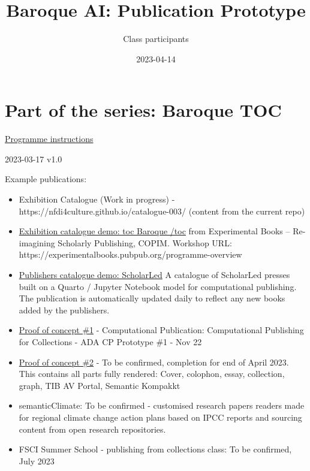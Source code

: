 \documentclass[
  letterpaper,
]{book}
\title{Baroque AI: Publication Prototype}
\author{Class participants}
\date{2023-04-14}
\renewcommand*\contentsname{Table of contents}
\newcommand\contentsname{Table of contents}
\begin{document}
\frontmatter
\maketitle
\ifdefined\Shaded\renewenvironment{Shaded}{\begin{tcolorbox}[enhanced, borderline west={3pt}{0pt}{shadecolor}, interior hidden, boxrule=0pt, breakable, sharp corners, frame hidden]}{\end{tcolorbox}}\fi

\renewcommand*\contentsname{Table of contents}
{
\setcounter{tocdepth}{2}
\tableofcontents
}
\mainmatter
{}

\hypertarget{part-of-the-series-baroque-toc}{%
\chapter{Part of the series: Baroque
TOC}\label{part-of-the-series-baroque-toc}}

\href{https://nfdi4culture.github.io/class-ADA-CP-pipeline/}{Programme
instructions}

2023-03-17 v1.0

Example publications:

\begin{itemize}
\item
  Exhibition Catalogue (Work in progress) -
  https://nfdi4culture.github.io/catalogue-003/ (content from the
  current repo)
\item
  \href{https://nfdi4culture.github.io/experimental-books-workshop/}{Exhibition
  catalogue demo: toc Baroque /toc} from Experimental Books --
  Re-imagining Scholarly Publishing, COPIM. Workshop URL:
  https://experimentalbooks.pubpub.org/programme-overview
\item
  \href{https://simonxix.github.io/scholarled_catalogue/}{Publishers
  catalogue demo: ScholarLed} A catalogue of ScholarLed presses built on
  a Quarto / Jupyter Notebook model for computational publishing. The
  publication is automatically updated daily to reflect any new books
  added by the publishers.
\item
  \href{https://nfdi4culture.github.io/cp4c/}{Proof of concept \#1} -
  Computational Publication: Computational Publishing for Collections -
  ADA CP Prototype \#1 - Nov 22
\item
  \href{https://nfdi4culture.github.io/art_catalogue_test/}{Proof of
  concept \#2} - To be confirmed, completion for end of April 2023. This
  contains all parts fully rendered: Cover, colophon, essay, collection,
  graph, TIB AV Portal, Semantic Kompakkt
\item
  semanticClimate: To be confirmed - customised research papers readers
  made for regional climate change action plans based on IPCC reports
  and sourcing content from open research repositories.
\item
  FSCI Summer School - publishing from collections class: To be
  confirmed, July 2023
\end{itemize}
\end{document}
